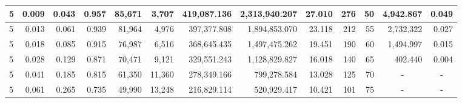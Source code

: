 \documentclass[fontsize=11pt]{article}
\begin{document}
\begin{landscape}
\begin{table}[]
\begin{tabular}{lrrrrrrrrrr|r|r|}
\multicolumn{1}{|l|}{5} & \multicolumn{1}{r|}{0.009} & \multicolumn{1}{r|}{0.043} & \multicolumn{1}{r|}{0.957} & \multicolumn{1}{r|}{85,671}  & \multicolumn{1}{r|}{3,707}  & \multicolumn{1}{r|}{419,087.136} & \multicolumn{1}{r|}{2,313,940.207} & \multicolumn{1}{r|}{27.010} & \multicolumn{1}{r|}{276}   & 50                     & 4,942.867                                 & 0.049                               \\ \hline
\multicolumn{1}{|l|}{5} & \multicolumn{1}{r|}{0.013} & \multicolumn{1}{r|}{0.061} & \multicolumn{1}{r|}{0.939} & \multicolumn{1}{r|}{81,964}  & \multicolumn{1}{r|}{4,976}  & \multicolumn{1}{r|}{397,377.808} & \multicolumn{1}{r|}{1,894,853.070} & \multicolumn{1}{r|}{23.118} & \multicolumn{1}{r|}{212}   & 55                     & 2,732.322                                 & 0.027                               \\ \hline
\multicolumn{1}{|l|}{5} & \multicolumn{1}{r|}{0.018} & \multicolumn{1}{r|}{0.085} & \multicolumn{1}{r|}{0.915} & \multicolumn{1}{r|}{76,987}  & \multicolumn{1}{r|}{6,516}  & \multicolumn{1}{r|}{368,645.435} & \multicolumn{1}{r|}{1,497,475.262} & \multicolumn{1}{r|}{19.451} & \multicolumn{1}{r|}{190}   & 60                     & 1,494.997                                 & 0.015                               \\ \hline
\multicolumn{1}{|l|}{5} & \multicolumn{1}{r|}{0.028} & \multicolumn{1}{r|}{0.129} & \multicolumn{1}{r|}{0.871} & \multicolumn{1}{r|}{70,471}  & \multicolumn{1}{r|}{9,121}  & \multicolumn{1}{r|}{329,551.243} & \multicolumn{1}{r|}{1,128,829.827} & \multicolumn{1}{r|}{16.018} & \multicolumn{1}{r|}{140}   & 65                     & 402.440                                   & 0.004                               \\ \hline
\multicolumn{1}{|l|}{5} & \multicolumn{1}{r|}{0.041} & \multicolumn{1}{r|}{0.185} & \multicolumn{1}{r|}{0.815} & \multicolumn{1}{r|}{61,350}  & \multicolumn{1}{r|}{11,360} & \multicolumn{1}{r|}{278,349.166} & \multicolumn{1}{r|}{799,278.584}   & \multicolumn{1}{r|}{13.028} & \multicolumn{1}{r|}{125}   & 70                     & \multicolumn{1}{c|}{-}                    & \multicolumn{1}{c|}{-}              \\ \hline
\multicolumn{1}{|l|}{5} & \multicolumn{1}{r|}{0.061} & \multicolumn{1}{r|}{0.265} & \multicolumn{1}{r|}{0.735} & \multicolumn{1}{r|}{49,990}  & \multicolumn{1}{r|}{13,248} & \multicolumn{1}{r|}{216,829.114} & \multicolumn{1}{r|}{520,929.417}   & \multicolumn{1}{r|}{10.421} & \multicolumn{1}{r|}{101}   & 75                     & \multicolumn{1}{c|}{-}                    & \multicolumn{1}{c|}{-}              \\ \hline

\end{tabular}
\end{table}
\end{landscape}
\end{document}
